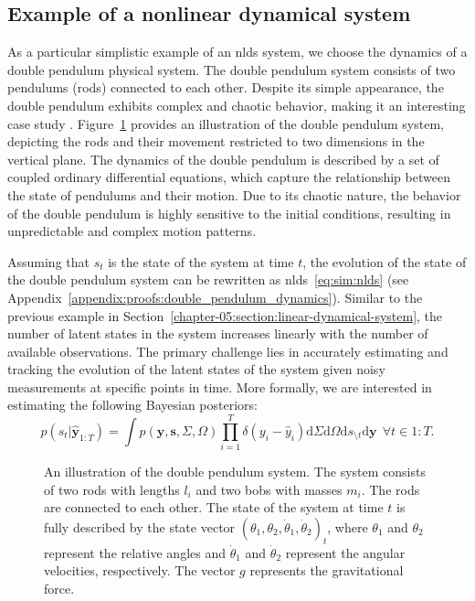 \subsection{Example of a nonlinear dynamical system}

As a particular simplistic example of an \ac{nlds} system, we choose the dynamics of a double
pendulum physical system.
The double pendulum system consists of two pendulums (rods) connected to each other.
Despite its simple appearance, the double pendulum exhibits complex and chaotic behavior,
making it an interesting case study \citep{levien_double_1993}.
Figure~\ref{fig:sim:double_pendulum_notation} provides an illustration of the double
pendulum system, depicting the rods and their movement restricted to two dimensions in the
vertical plane.
The dynamics of the double pendulum is described by a set of coupled ordinary differential
equations, which capture the relationship between the state of pendulums and their motion.
Due to its chaotic nature, the behavior of the double pendulum is highly sensitive to the
initial conditions, resulting in unpredictable and complex motion patterns.

Assuming that $s_t$ is the state of the system at time $t$, the evolution of the state of the double pendulum system can be
rewritten as \ac{nlds}~\eqref{eq:sim:nlds} (see Appendix~\ref{appendix:proofs:double_pendulum_dynamics}). 
Similar to the previous example in Section~\ref{chapter-05:section:linear-dynamical-system}, the number of latent states in the system increases linearly with the number of available observations.
The primary challenge lies in accurately estimating and tracking the evolution of the latent
states of the system given noisy measurements at specific points in time. 
More formally, we are interested in estimating the following Bayesian posteriors:
\begin{equation}
    \label{eq:sim:nlds-problem-statement}
    p(s_t\vert\hat{\bm{y}}_{1:T}) = \int p(\bm{y}, \bm{s}, \Sigma, \Omega)\prod_{i = 1}^{T}\delta(y_i - \hat{y}_i)\mathrm{d}\Sigma\mathrm{d}\Omega\mathrm{d}s_{\setminus t}\mathrm{d}\bm{y}~~\forall t \in 1:T.
\end{equation}

\begin{figure}
  \centering
  \resizebox{0.75\textwidth}{!}{}
  \caption{
    An illustration of the double pendulum system.
    The system consists of two rods with lengths $l_i$ and two bobs with masses $m_i$.
    The rods are connected to each other.
    The state of the system at time $t$ is fully described by the state vector $(\theta_1,
      \theta_2, \dot{\theta}_1, \dot{\theta}_2)_t$, where $\theta_1$ and $\theta_2$ represent the 
      relative angles and $\dot{\theta}_1$ and $\dot{\theta}_2$ represent the angular velocities,
    respectively.
    The vector $g$ represents the gravitational force.
  }
  \label{fig:sim:double_pendulum_notation}
\end{figure}

